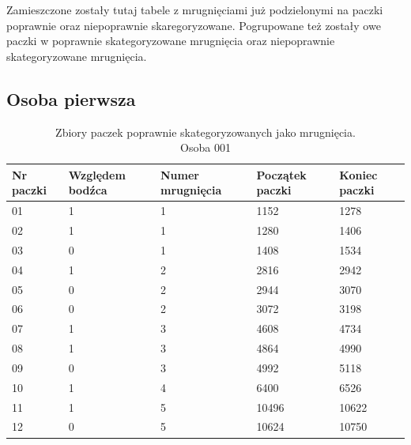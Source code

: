 \documentclass{article}
\begin{document}
        Zamieszczone zostały tutaj tabele z mrugnięciami już podzielonymi na paczki poprawnie oraz niepoprawnie skaregoryzowane. Pogrupowane też zostały owe paczki w poprawnie skategoryzowane mrugnięcia oraz niepoprawnie skategoryzowane mrugnięcia.

        \subsection*{Osoba pierwsza}
            \begin{table}[H]
                \captionsetup{justification=centering}
                \caption {Zbiory paczek poprawnie skategoryzowanych jako mrugnięcia. \\ Osoba 001}
                \begin{center}
                    \begin{tabular}{| p{1cm} | p{1.75cm} | p{1.75cm} | p{1.75cm} | p{1.75cm} |}
                        \hline
                        Nr paczki & Względem bodźca & Numer mrugnięcia & Początek paczki & Koniec paczki \\
                        \hline
                        \hline
                        01 & 1 & 1 & 1152 & 1278 \\ 
                        \hline
                        02 & 1 & 1 & 1280 & 1406 \\ 
                        \hline
                        03 & 0 & 1 & 1408 & 1534 \\ 
                        \hline
                        04 & 1 & 2 & 2816 & 2942 \\ 
                        \hline
                        05 & 0 & 2 & 2944 & 3070 \\ 
                        \hline
                        06 & 0 & 2 & 3072 & 3198 \\ 
                        \hline
                        07 & 1 & 3 & 4608 & 4734 \\ 
                        \hline
                        08 & 1 & 3 & 4864 & 4990 \\ 
                        \hline
                        09 & 0 & 3 & 4992 & 5118 \\ 
                        \hline
                        10 & 1 & 4 & 6400 & 6526 \\ 
                        \hline
                        11 & 1 & 5 & 10496 & 10622 \\ 
                        \hline
                        12 & 0 & 5 & 10624 & 10750 \\ 

\end{tabular}
\end{center}
\end{table}
\end{document}
